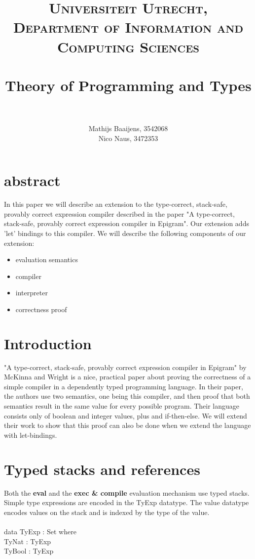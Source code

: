 \documentclass[paper=a4, fontsize=11pt]{scrartcl} %
\title{ 
\normalfont \normalsize 
\textsc{Universiteit Utrecht, Department of Information and Computing Sciences} \\ [25pt] %
\horrule{0.5pt} \\[0.4cm] %
\huge Theory of Programming and Types\\ %
\horrule{2pt} \\[0.5cm] %
}
\author{Mathijs Baaijens, 3542068 \\ Nico Naus, 3472353} %
\numberwithin{equation}{section} %
\numberwithin{figure}{section} %
\numberwithin{table}{section} %
\begin{document}
\maketitle %


\section{abstract}
In this paper we will describe an extension to the type-correct, stack-safe, provably correct expression compiler described in the paper "A type-correct, stack-safe, provably correct expression compiler in Epigram". Our extension adds 'let' bindings to this compiler. We will describe the following components of our extension:
\begin{itemize}
\item{evaluation semantics}
\item{compiler}
\item{interpreter}
\item{correctness proof}
\end{itemize}

\section{Introduction}
"A type-correct, stack-safe, provably correct expression compiler in Epigram" by McKinna and Wright is a nice, practical paper about proving the correctness of a simple compiler in a dependently typed programming language. In their paper, the authors use two semantics, one being this compiler, and then proof that both semantics result in the same value for every possible program. Their language consists only of boolean and integer values, plus and if-then-else. We will extend their work to show that this proof can also be done when we extend the language with let-bindings.

\section{Typed stacks and references}
Both the \textbf{eval} and the \textbf{exec \& compile} evaluation mechanism use typed stacks. Simple type expressions are encoded in the TyExp datatype. The value datatype encodes values on the stack and is indexed by the type of the value. \\
\\
\ttfamily
data TyExp : Set where\\
  TyNat : TyExp\\
  TyBool : TyExp\\
\end{document}
